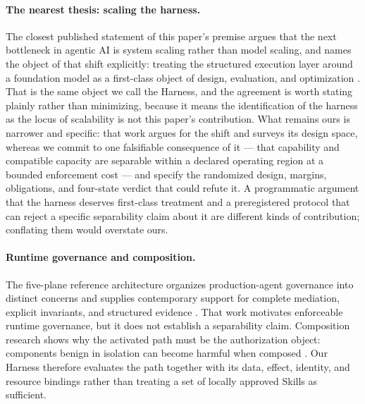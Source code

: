 \paragraph{The nearest thesis: scaling the harness.}
The closest published statement of this paper's premise argues that the next bottleneck in agentic AI is system scaling rather than model scaling, and names the object of that shift explicitly: treating the structured execution layer around a foundation model as a first-class object of design, evaluation, and optimization \cite{gu2026systemscaling}. That is the same object we call the Harness, and the agreement is worth stating plainly rather than minimizing, because it means the identification of the harness as the locus of scalability is not this paper's contribution. What remains ours is narrower and specific: that work argues for the shift and surveys its design space, whereas we commit to one falsifiable consequence of it --- that capability and compatible capacity are separable within a declared operating region at a bounded enforcement cost --- and specify the randomized design, margins, obligations, and four-state verdict that could refute it. A programmatic argument that the harness deserves first-class treatment and a preregistered protocol that can reject a specific separability claim about it are different kinds of contribution; conflating them would overstate ours.

\paragraph{Runtime governance and composition.}
The five-plane reference architecture organizes production-agent governance into distinct concerns and supplies contemporary support for complete mediation, explicit invariants, and structured evidence \cite{tallam2026fiveplane}. That work motivates enforceable runtime governance, but it does not establish a separability claim. Composition research shows why the activated path must be the authorization object: components benign in isolation can become harmful when composed \cite{xie2026composition}. Our Harness therefore evaluates the path together with its data, effect, identity, and resource bindings rather than treating a set of locally approved Skills as sufficient.

